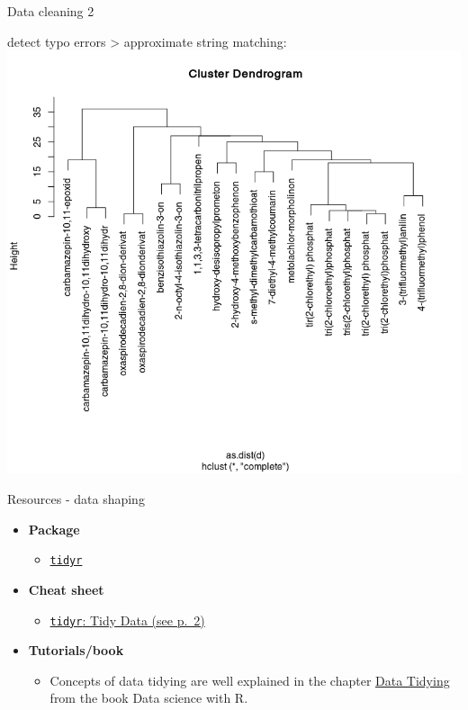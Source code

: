 \documentclass[8pt,ignorenonframetext,]{beamer}
\providecommand{\tightlist}{%
  \setlength{\itemsep}{0pt}\setlength{\parskip}{0pt}}
\begin{document}
\begin{frame}{Data cleaning 2}

detect typo errors \textgreater{} approximate string matching:
\includegraphics{imgPres/data_cleaning_dendrogram.png}

\end{frame}

\begin{frame}[fragile]{Resources - data shaping}

\begin{itemize}
\tightlist
\item
  \textbf{Package}

  \begin{itemize}
  \tightlist
  \item
    \href{https://cran.r-project.org/web/packages/tidyr/index.html}{\texttt{tidyr}}
  \end{itemize}
\item
  \textbf{Cheat sheet}

  \begin{itemize}
  \tightlist
  \item
    \href{https://github.com/rstudio/cheatsheets/raw/master/data-import.pdf}{\texttt{tidyr}:
    Tidy Data (see p.~2)}
  \end{itemize}
\item
  \textbf{Tutorials/book}

  \begin{itemize}
  \tightlist
  \item
    Concepts of data tidying are well explained in the chapter
    \href{http://garrettgman.github.io/tidying/}{Data Tidying} from the
    book Data science with R.
  \end{itemize}
\end{itemize}

\end{frame}
\end{document}
